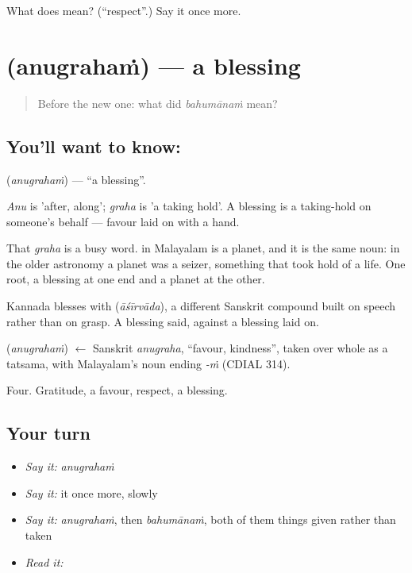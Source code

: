 \begin{tcolorbox}[breakable,colback=teal!4,colframe=teal!35!black,title={Before you move on}]
What does  mean? (\textquotedblleft{}respect\textquotedblright{}.) Say it once more.
\end{tcolorbox}
\section[\texorpdfstring{\ml{അനുഗ്രഹം} (anugrahaṁ)}{അനുഗ്രഹം (anugrahaṁ)}]{ (anugrahaṁ) — a blessing}

\label{lesson:ML-C51-blessing}



\begin{quote}
Before the new one: what did \emph{bahumānaṁ} mean?
\end{quote}

\subsection*{You'll want to know: }
\textbf{} (\emph{anugrahaṁ}) — \textquotedblleft{}a blessing\textquotedblright{}.

\emph{Anu} is 'after, along'; \emph{graha} is 'a taking hold'. A blessing is a taking-hold on someone's behalf — favour laid on with a hand.

That \emph{graha} is a busy word.  in Malayalam is a planet, and it is the same noun: in the older astronomy a planet was a seizer, something that took hold of a life. One root, a blessing at one end and a planet at the other.

Kannada blesses with  (\emph{āśīrvāda}), a different Sanskrit compound built on speech rather than on grasp. A blessing said, against a blessing laid on.

\begin{cousinweb}
\textbf{} (\emph{anugrahaṁ}) $\leftarrow$ Sanskrit \emph{anugraha}, \textquotedblleft{}favour, kindness\textquotedblright{}, taken over whole as a tatsama, with Malayalam's noun ending \emph{-ṁ} (CDIAL 314).
\end{cousinweb}

\begin{grammarlens}[title={What you've built}]
Four. Gratitude, a favour, respect, a blessing.
\end{grammarlens}

\subsection*{Your turn}
\begin{itemize}
\raggedright
  \item \emph{Say it:} \emph{anugrahaṁ}
  \item \emph{Say it:} it once more, slowly
  \item \emph{Say it:} \emph{anugrahaṁ}, then \emph{bahumānaṁ}, both of them things given rather than taken
  \item \emph{Read it:} \textbf{}
\end{itemize}

